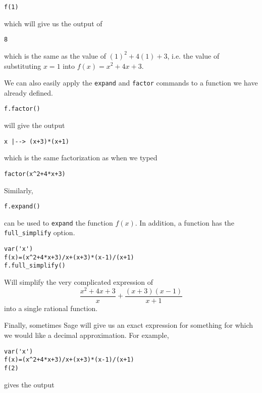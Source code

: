 \begin{verbatim}
f(1)
\end{verbatim}

which will give us the output of

\begin{verbatim}
8
\end{verbatim}

which is the same as the value of $(1)^2+4(1)+3$, i.e. the value of
substituting $x=1$ into $f(x)=x^2+4x+3$.

We can also easily apply the {\tt expand} and {\tt factor}
commands to a function we have already defined.

\begin{verbatim}
f.factor()
\end{verbatim}

will give the output

\begin{verbatim}
x |--> (x+3)*(x+1)
\end{verbatim}

which is the same factorization as when we typed

\begin{verbatim}
factor(x^2+4*x+3)
\end{verbatim}

Similarly,

\begin{verbatim}
f.expand()
\end{verbatim}

can be used to {\tt expand} the function $f(x)$. In addition,
a function has the {\tt full\_simplify} option.

\begin{verbatim}
var('x')
f(x)=(x^2+4*x+3)/x+(x+3)*(x-1)/(x+1)
f.full_simplify()
\end{verbatim}

Will simplify the very complicated expression of
\begin{equation*}
	\frac{x^2+4x+3}{x} + \frac{(x+3)(x-1)}{x+1}
\end{equation*}
into a single rational function.

Finally, sometimes Sage will give us an exact expression for
something for which we would like a decimal approximation.
For example, 

\begin{verbatim}
var('x')
f(x)=(x^2+4*x+3)/x+(x+3)*(x-1)/(x+1)
f(2)
\end{verbatim}

gives the output

